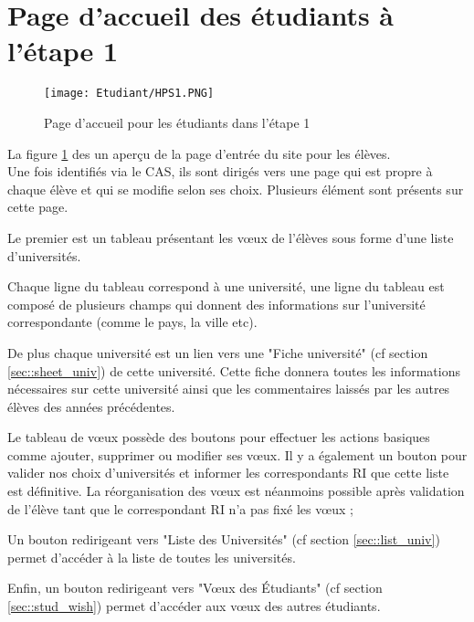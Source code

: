 \section{Page d'accueil des étudiants à l'étape 1}

\begin{figure}[H]
	\texttt{[image: Etudiant/HPS1.PNG]}
	\caption{Page d'accueil pour les étudiants dans l'étape 1}
	\label{fig::hps1}
\end{figure}

La figure \ref{fig::hps1} des un aperçu de la page d'entrée du site pour les élèves.\\
Une fois identifiés via le CAS, ils sont dirigés vers une page qui est propre à chaque élève et qui se modifie selon ses choix.
Plusieurs élément sont présents sur cette page.

\bigbreak

Le premier est un tableau présentant les vœux de l'élèves sous forme d'une liste d'universités.

Chaque ligne du tableau correspond à une université, une ligne du tableau est composé de plusieurs champs qui donnent des informations sur l'université correspondante (comme le pays, la ville etc).

De plus chaque université est un lien vers une "Fiche université" (cf section \ref{sec::sheet_univ}) de cette université. Cette fiche donnera toutes les informations nécessaires sur cette université ainsi que les commentaires laissés par les autres élèves des années précédentes.

Le tableau de vœux possède des boutons pour effectuer les actions basiques comme ajouter, supprimer ou modifier ses vœux. Il y a également un bouton pour valider nos choix d'universités et informer les correspondants RI que cette liste est définitive. La réorganisation des vœux est néanmoins possible après validation de l'élève tant que le correspondant RI n'a pas fixé les vœux ;

\bigbreak

Un bouton redirigeant vers "Liste des Universités" (cf section \ref{sec::list_univ}) permet d'accéder à la liste de toutes les universités.

\bigbreak

Enfin, un bouton redirigeant vers "Vœux des Étudiants" (cf section \ref{sec::stud_wish}) permet d'accéder aux vœux des autres étudiants.
